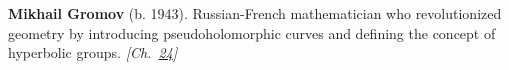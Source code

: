 \textbf{Mikhail Gromov} (b. 1943). Russian-French mathematician who revolutionized geometry by introducing pseudoholomorphic curves and defining the concept of hyperbolic groups. \emph{[Ch.~\hyperref[ch:4dspacetime]{24}]}

